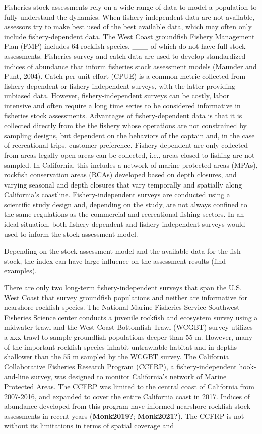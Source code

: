 \documentclass[]{elsarticle} %
\begin{document}
Fisheries stock assessments rely on a wide range of data to model a
population to fully understand the dynamics. When fishery-independent
data are not available, assessors try to make best used of the best
available data, which may often only include fishery-dependent data. The
West Coast groundfish Fishery Management Plan (FMP) includes 64 rockfish
species, \_\_\_ of which do not have full stock assessments. Fisheries
survey and catch data are used to develop standardized indices of
abundance that inform fisheries stock assessment models (Maunder and
Punt, 2004). Catch per unit effort (CPUE) is a common metric collected
from fishery-dependent or fishery-independent surveys, with the latter
providing unbiased data. However, fishery-independent surveys can be
costly, labor intensive and often require a long time series to be
considered informative in fisheries stock assessments. Advantages of
fishery-dependent data is that it is collected directly from the the
fishery whose operations are not constrained by sampling designs, but
dependent on the behaviors of the captain and, in the case of
recreational trips, customer preference. Fishery-dependent are only
collected from areas legally open areas can be collected, i.e., areas
closed to fishing are not sampled. In California, this includes a
network of marine protected areas (MPAs), rockfish conservation areas
(RCAs) developed based on depth closures, and varying seasonal and depth
closures that vary temporally and spatially along California's
coastline. Fishery-independent surveys are conducted using a scientific
study design and, depending on the study, are not always confined to the
same regulations as the commercial and recreational fishing sectors. In
an ideal situation, both fishery-dependent and fishery-independent
surveys would used to inform the stock assessment model.

Depending on the stock assessment model and the available data for the
fish stock, the index can have large influence on the assessment results
(find examples).

There are only two long-term fishery-independent surveys that span the
U.S. West Coast that survey groundfish populations and neither are
informative for nearshore rockfish species. The National Marine
Fisheries Service Southwest Fisheries Science center conducts a juvenile
rockfish and ecosystem survey using a midwater trawl and the West Coast
Bottomfish Trawl (WCGBT) survey utilizes a xxx trawl to sample
groundfish populations deeper than 55 m. However, many of the important
rockfish species inhabit untrawlable habitat and in depths shallower
than the 55 m sampled by the WCGBT survey. The California Collaborative
Fisheries Research Program (CCFRP), a fishery-independent hook-and-line
survey, was designed to monitor California's network of Marine Protected
Areas. The CCFRP was limited to the central coast of California from
2007-2016, and expanded to cover the entire California coast in 2017.
Indices of abundance developed from this program have informed nearshore
rockfish stock assessments in recent years (\textbf{Monk2019?};
\textbf{Monk2021?}). The CCFRP is not without its limitations in terms
of spatial coverage and
\end{document}
